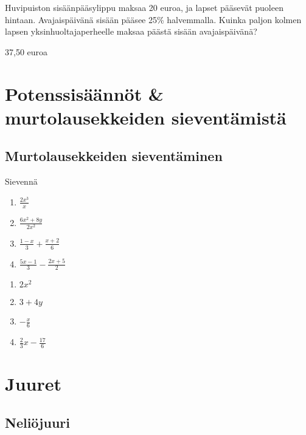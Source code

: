 \begin{tehtava} %
Huvipuiston sisäänpääsylippu maksaa 20 euroa, ja lapset pääsevät puoleen hintaan. Avajaispäivänä sisään pääsee 25\% halvemmalla. Kuinka paljon kolmen lapsen yksinhuoltajaperheelle maksaa päästä sisään avajaispäivänä?
\begin{vastaus}
37,50 euroa
\end{vastaus}
\end{tehtava}

\chapter{Potenssisäännöt \& murtolausekkeiden sieventämistä}

\section{Murtolausekkeiden sieventäminen}

\begin{tehtava}
Sievennä
\begin{enumerate}
\item $\frac{2x^3}{x}$
\item $\frac{6x^2+8y}{2x^2}$
\item $ \frac{1-x}{3} + \frac{x+2}{6}$
\item $ \frac{5x-1}{3} - \frac{2x+5}{2}$
\end{enumerate}
\begin{vastaus}
\begin{enumerate}
\item $2x^2$
\item $3+4y$
\item $ -\frac{x}{6}$
\item $ \frac{2}{3} x - \frac{17}{6}$
\end{enumerate}
\end{vastaus}
\end{tehtava}

\chapter{Juuret}

\section{Neliöjuuri}


